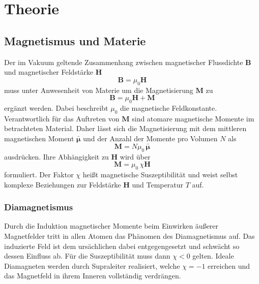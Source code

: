 \section[Theorie]{Theorie \textnormal{\cite{paramagnet}}}
\label{sec:theorie}

\subsection{Magnetismus und Materie}

Der im Vakuum geltende Zusammenhang zwischen magnetischer Flussdichte $\symbf B$ und magnetischer Feldstärke $\symbf H$
\begin{equation*}
	\symbf B = \mu_0 \symbf H
	\label{eqn:vakuum}
\end{equation*}
muss unter Anwesenheit von Materie um die Magnetisierung $\symbf M$ zu
\begin{equation*}
	\symbf B = \mu_0 \symbf H + \symbf M
	\label{eqn:materie}
\end{equation*}
ergänzt werden. Dabei beschreibt $\mu_0$ die magnetische Feldkonstante. Verantwortlich für das Auftreten von $\symbf M$
sind atomare magnetische Momente im betrachteten Material. Daher lässt sich die Magnetisierung mit dem mittleren
magnetischen Moment $\bar{\symbf \mu}$ und der Anzahl der Momente pro Volumen $N$ als
\begin{equation}
	\symbf M = N \mu_0 \, \bar{\symbf \mu}
	\label{eqn:magnet_moment}
\end{equation}
ausdrücken. Ihre Abhängigkeit zu $\symbf H$ wird über
\begin{equation}
	\symbf M = \mu_0 \, \chi \symbf H
	\label{eqn:magnet_feld}
\end{equation}
formuliert. Der Faktor $\chi$ heißt magnetische Suszeptibilität und weist selbst komplexe Beziehungen zur Feldstärke
$\symbf H$ und Temperatur $T$ auf.

\subsubsection{Diamagnetismus}

Durch die Induktion magnetischer Momente beim Einwirken äußerer Magnetfelder tritt in allen Atomen das Phänomen des
Diamagnetismus auf. Das induzierte Feld ist dem ursächlichen dabei entgegengesetzt und schwächt so dessen Einfluss ab.
Für die Suszeptibilität muss dann $\chi < 0 $ gelten. Ideale Diamagneten werden durch Supraleiter realisiert, welche
$\chi = -1$ erreichen und das Magnetfeld in ihrem Inneren vollständig verdrängen.

